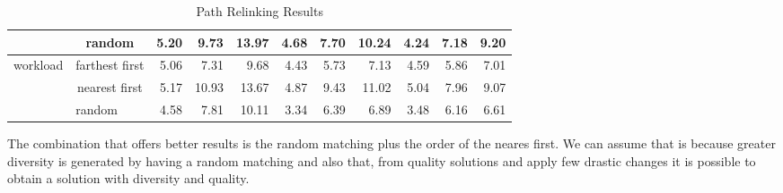 \begin{table}[H]
{\begin{minipage}{\textwidth}
\begin{tabular}{c|c|rrr|rrr|rrr|}
    \multicolumn{1}{|c|}{}
    & random
    & 5.20       & 9.73       & 13.97
    & 4.68       & 7.70       & 10.24
    & 4.24       & 7.18       & 9.20
    \\ \hline
    \multicolumn{1}{|c|}{\multirow{3}{*}{workload}}
    & farthest first
    & 5.06       & 7.31       & 9.68
    & 4.43       & 5.73       & 7.13
    & 4.59       & 5.86       & 7.01
    \\
    \multicolumn{1}{|c|}{}
    & nearest first
    & 5.17       & 10.93      & 13.67
    & 4.87       & 9.43       & 11.02
    & 5.04       & 7.96       & 9.07
    \\
    \multicolumn{1}{|c|}{}
    & \multicolumn{1}{l|}{random}
    & 4.58       & 7.81       & 10.11
    & 3.34       & 6.39       & 6.89
    & 3.48       & 6.16       & 6.61
    \\ \hline
  \end{tabular}
  \end{minipage}}
  \caption{Path Relinking Results}
\end{table}
The combination that offers better results
is the random matching
plus
the order of the neares first.
We can assume that is
because greater diversity
is generated by having a random matching
and also that,
from quality solutions
and apply few drastic changes
it is possible to obtain a solution with diversity and quality.
